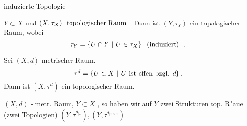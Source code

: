 \documentclass[class=article, crop=false]{standalone}
\begin{document}
\begin{zettel}{induzierte Topologie}
\begin{flashcard}
    $Y \subset X$ und $(X,\tau_X)  \tx{ topologischer Raum }$ 
    Dann ist $(Y,\tau_Y)$ ein topologischer Raum, wobei
    \[
        \tau_Y = \set{U \cap Y}{U \in  \tau _X} \tx{ (induziert) } 
    .\]
\end{flashcard}

\begin{example}
    Sei $ (X,d) $-metrischer Raum.
    \[
        \tau^d = \set{U \subset X}{U \text{ ist offen bzgl. } d }
    .\]
    Dann ist $(X, \tau^d)$  ein topologischer Raum.
\end{example}

\begin{example}
    $(X,d)$ - metr. Raum, $Y \subset X$ , so haben wir auf $Y$ zwei Strukturen top. R"aue (zwei Topologien) $(Y,\tau^{d_{|_Y}}), (Y, \tau^{d_{|Y \times Y}})$ 
\end{example}

\end{zettel}
\end{document}
